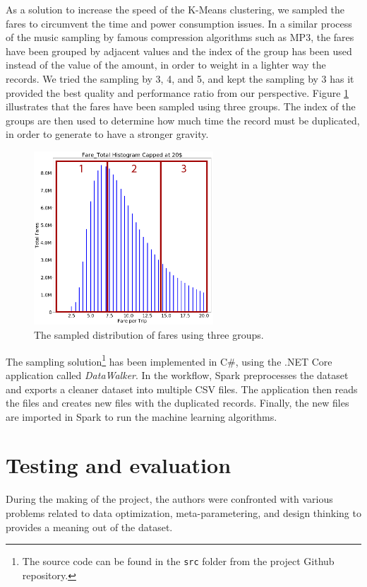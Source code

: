 \documentclass[a4paper]{article}
\begin{document}
As a solution to increase the speed of the K-Means clustering, we sampled the fares to circumvent the time and power consumption issues. In a similar process of the music sampling by famous compression algorithms such as MP3, the fares have been grouped by adjacent values and the index of the group has been used instead of the value of the amount, in order to weight in a lighter way the records. We tried the sampling by 3, 4, and 5, and kept the sampling by 3 has it provided the best quality and performance ratio from our perspective. Figure \ref{fig:distribution-fares-sampled} illustrates that the fares have been sampled using three groups. The index of the groups are then used to determine how much time the record must be duplicated, in order to generate to have a stronger gravity.

\begin{figure}
  \centering
  \includegraphics[width=0.6\textwidth]{images/distribution-fares-sampled.png}
  \caption{The sampled distribution of fares using three groups.}
  \label{fig:distribution-fares-sampled}
\end{figure}

The sampling solution\footnote{The source code can be found in the \texttt{src} folder from the project Github repository.} has been implemented in C\#, using the .NET Core application called \emph{DataWalker}. In the workflow, Spark preprocesses the dataset and exports a cleaner dataset into multiple CSV files. The application then reads the files and creates new files with the duplicated records. Finally, the new files are imported in Spark to run the machine learning algorithms. 


\section{Testing and evaluation}
During the making of the project, the authors were confronted with various problems related to data optimization, meta-parametering, and design thinking to provides a meaning out of the dataset.
\end{document}
